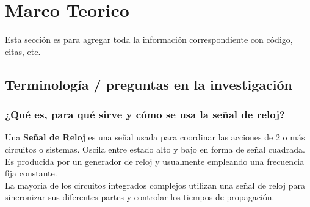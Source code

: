 \documentclass{article}
\begin{document}
\section{Marco Teorico} \label{investigación}
Esta sección es para agregar toda la información correspondiente con código, citas, etc.

\subsection{Terminología / preguntas en la investigación}
\subsubsection*{¿Qué es, para qué sirve y cómo se usa la señal de reloj?}
Una \textbf{Señal de Reloj} \cite{señal_reloj} es una señal usada para coordinar las acciones de 2 o más circuitos o sistemas. Oscila entre estado alto y bajo en forma de señal cuadrada. 
\\[0.2cm]
Es producida por un generador de reloj y usualmente empleando una frecuencia fija constante.
\\[0.2cm]
La mayoria de los circuitos integrados complejos utilizan una señal de reloj para sincronizar sus diferentes partes y controlar los tiempos de propagación.
\end{document}
